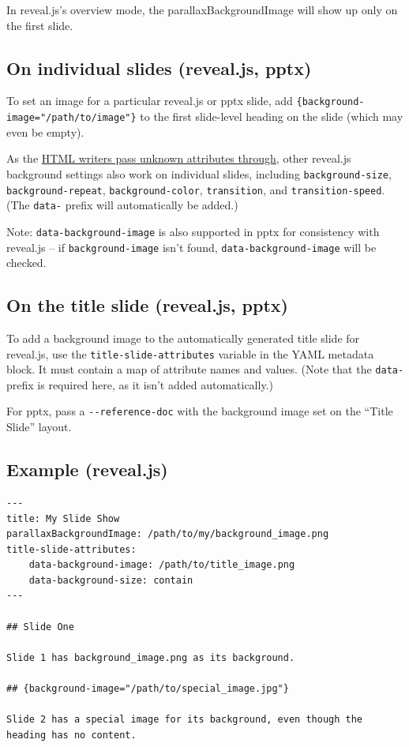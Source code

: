 \documentclass[
  b5paper
]{book}
\begin{document}
In reveal.js's overview mode, the parallaxBackgroundImage will show up
only on the first slide.

\subsection{On individual slides (reveal.js,
pptx)}\label{on-individual-slides-reveal.js-pptx}

To set an image for a particular reveal.js or pptx slide, add
\texttt{\{background-image="/path/to/image"\}} to the first slide-level
heading on the slide (which may even be empty).

As the \hyperref[extension-link_attributes]{HTML writers pass unknown
attributes through}, other reveal.js background settings also work on
individual slides, including \texttt{background-size},
\texttt{background-repeat}, \texttt{background-color},
\texttt{transition}, and \texttt{transition-speed}. (The \texttt{data-}
prefix will automatically be added.)

Note: \texttt{data-background-image} is also supported in pptx for
consistency with reveal.js -- if \texttt{background-image} isn't found,
\texttt{data-background-image} will be checked.

\subsection{On the title slide (reveal.js,
pptx)}\label{on-the-title-slide-reveal.js-pptx}

To add a background image to the automatically generated title slide for
reveal.js, use the \texttt{title-slide-attributes} variable in the YAML
metadata block. It must contain a map of attribute names and values.
(Note that the \texttt{data-} prefix is required here, as it isn't added
automatically.)

For pptx, pass a \texttt{-\/-reference-doc} with the background image
set on the ``Title Slide'' layout.

\subsection{Example (reveal.js)}\label{example-reveal.js}

\begin{verbatim}
---
title: My Slide Show
parallaxBackgroundImage: /path/to/my/background_image.png
title-slide-attributes:
    data-background-image: /path/to/title_image.png
    data-background-size: contain
---

## Slide One

Slide 1 has background_image.png as its background.

## {background-image="/path/to/special_image.jpg"}

Slide 2 has a special image for its background, even though the heading has no content.
\end{verbatim}
\end{document}
